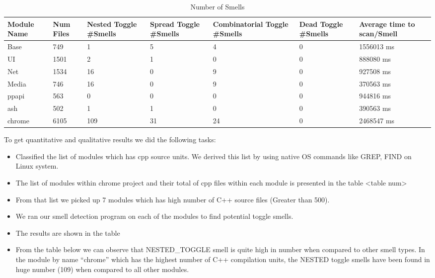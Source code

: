 \documentclass[conference]{IEEEtran}
\begin{document}
\begin{table}[ht]
\caption{Number of Smells}
\centering
\begin{tabular}{|p{2.1cm}|p{2.1cm}|p{2.1cm}|p{2.1cm}|p{2.1cm}|p{2.1cm}|p{2.1cm}|}
 \hline\hline
Module Name & Num Files & Nested Toggle \#Smells & Spread Toggle \#Smells & Combinatorial Toggle \#Smells &  Dead Toggle \#Smells & Average time to scan/Smell \\ \hline

Base & 749 & 1 & 5 & 4  & 0 & 1556013 ms \\ \hline
UI & 1501 & 2 & 1 & 0  & 0 & 888080 ms \\ \hline
Net & 1534 & 16 & 0 & 9  & 0 & 927508 ms \\ \hline
Media & 746 & 16 & 0 & 9  & 0 & 370563 ms \\ \hline
ppapi & 563 & 0 & 0 & 0  & 0 & 944816 ms \\ \hline
ash & 502 & 1 & 1 & 0  & 0 & 390563 ms \\ \hline
chrome & 6105 & 109 & 31 & 24  & 0 & 2468547 ms \\ \hline

\end{tabular}
\label{table:chrome-result-data}
\end{table}

To get quantitative and qualitative results we did the following tasks:

\begin{itemize}
\item Classified the list of modules which has cpp source units. We derived this list by using native OS commands like GREP, FIND on Linux system.
\item The list of modules within chrome project and their total of cpp files within each module is presented in the table <table num>
\item From that list we picked up 7 modules which has high number of C++ source files (Greater than 500).
\item We ran our smell detection program on each of the modules to find potential toggle smells.
\item The results are shown in the table
\item From the table below we can observe that NESTED\_TOGGLE smell is quite high in number when compared to other smell types. In the module by name “chrome” which has the highest number of C++ compilation units, the NESTED toggle smells have been found in huge number (109) when compared to all other modules.
\end{itemize}
\end{document}

